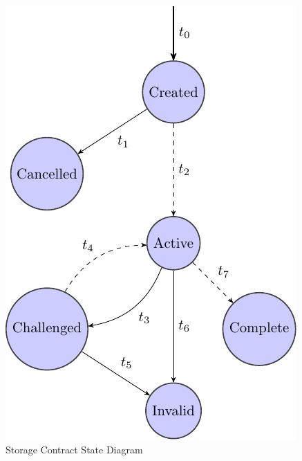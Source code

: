 \documentclass{article}
\begin{document}
\begin{figure}[t!]
\centering
    \vspace{-0.5in}
    \includegraphics{./contract-state-diagram-figure.pdf}
    \caption{Storage Contract State Diagram}
    \vspace{-0.05in}
\end{figure}
\end{document}

